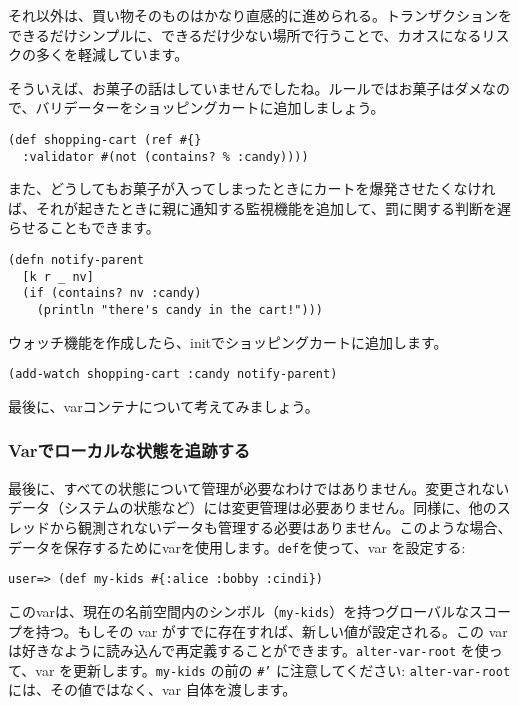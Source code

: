それ以外は、買い物そのものはかなり直感的に進められる。トランザクションをできるだけシンプルに、できるだけ少ない場所で行うことで、カオスになるリスクの多くを軽減しています。

そういえば、お菓子の話はしていませんでしたね。ルールではお菓子はダメなので、バリデーターをショッピングカートに追加しましょう。


\begin{lstlisting}[numbers=none]
(def shopping-cart (ref #{}
  :validator #(not (contains? % :candy))))
\end{lstlisting}

また、どうしてもお菓子が入ってしまったときにカートを爆発させたくなければ、それが起きたときに親に通知する監視機能を追加して、罰に関する判断を遅らせることもできます。


\begin{lstlisting}[numbers=none]
(defn notify-parent
  [k r _ nv]
  (if (contains? nv :candy)
    (println "there's candy in the cart!")))
\end{lstlisting}

ウォッチ機能を作成したら、initでショッピングカートに追加します。


\begin{lstlisting}[numbers=none]
(add-watch shopping-cart :candy notify-parent)
\end{lstlisting}

最後に、varコンテナについて考えてみましょう。





\subsubsection{Varでローカルな状態を追跡する}

最後に、すべての状態について管理が必要なわけではありません。変更されないデータ（システムの状態など）には変更管理は必要ありません。同様に、他のスレッドから観測されないデータも管理する必要はありません。このような場合、データを保存するためにvarを使用します。\texttt{def}を使って、var を設定する:


\begin{lstlisting}[numbers=none]
user=> (def my-kids #{:alice :bobby :cindi})
\end{lstlisting}

このvarは、現在の名前空間内のシンボル（\texttt{my-kids}）を持つグローバルなスコープを持つ。もしその var がすでに存在すれば、新しい値が設定される。この var は好きなように読み込んで再定義することができます。\texttt{alter-var-root} を使って、var を更新します。\texttt{my-kids} の前の \texttt{\#'} に注意してください: \texttt{alter-var-root} には、その値ではなく、var 自体を渡します。


